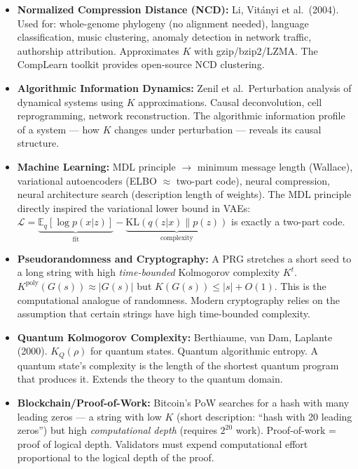 \begin{itemize}
\item \textbf{Normalized Compression Distance (NCD):} Li, Vit\'anyi et al.\ (2004). Used for: whole-genome phylogeny (no alignment needed), language classification, music clustering, anomaly detection in network traffic, authorship attribution. Approximates $K$ with gzip/bzip2/LZMA. The CompLearn toolkit provides open-source NCD clustering.

\item \textbf{Algorithmic Information Dynamics:} Zenil et al.\ Perturbation analysis of dynamical systems using $K$ approximations. Causal deconvolution, cell reprogramming, network reconstruction. The algorithmic information profile of a system --- how $K$ changes under perturbation --- reveals its causal structure.

\item \textbf{Machine Learning:} MDL principle $\to$ minimum message length (Wallace), variational autoencoders (ELBO $\approx$ two-part code), neural compression, neural architecture search (description length of weights). The MDL principle directly inspired the variational lower bound in VAEs: $\mathcal{L} = \underbrace{\mathbb{E}_q[\log p(x|z)]}_{\text{fit}} - \underbrace{\text{KL}(q(z|x) \| p(z))}_{\text{complexity}}$ is exactly a two-part code.

\item \textbf{Pseudorandomness and Cryptography:} A PRG stretches a short seed to a long string with high \emph{time-bounded} Kolmogorov complexity $K^t$. $K^{\text{poly}}(G(s)) \approx |G(s)|$ but $K(G(s)) \le |s| + O(1)$. This is the computational analogue of randomness. Modern cryptography relies on the assumption that certain strings have high time-bounded complexity.

\item \textbf{Quantum Kolmogorov Complexity:} Berthiaume, van Dam, Laplante (2000). $K_Q(\rho)$ for quantum states. Quantum algorithmic entropy. A quantum state's complexity is the length of the shortest quantum program that produces it. Extends the theory to the quantum domain.

\item \textbf{Blockchain/Proof-of-Work:} Bitcoin's PoW searches for a hash with many leading zeros --- a string with low $K$ (short description: ``hash with 20 leading zeros'') but high \emph{computational depth} (requires $2^{20}$ work). Proof-of-work = proof of logical depth. Validators must expend computational effort proportional to the logical depth of the proof.


\end{itemize}
